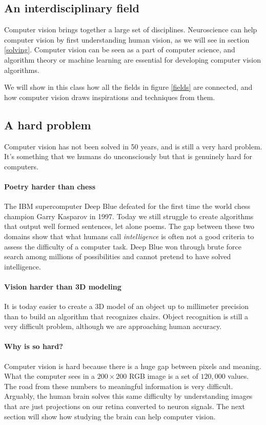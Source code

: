 \documentclass{article}
\begin{document}
\subsection{An interdisciplinary field}

Computer vision brings together a large set of disciplines. Neuroscience can help computer vision by first understanding human vision, as we will see in section \ref{solving}. Computer vision can be seen as a part of computer science, and algorithm theory or machine learning are essential for developing computer vision algorithms.

We will show in this class how all the fields in figure \ref{fields} are connected, and how computer vision draws inspirations and techniques from them.

\subsection{A hard problem}

Computer vision has not been solved in 50 years, and is still a very hard problem. It's something that we humans do unconsciously but that is genuinely hard for computers.

\paragraph{Poetry harder than chess}
The IBM supercomputer Deep Blue defeated for the first time the world chess champion Garry Kasparov in 1997. Today we still struggle to create algorithms that output well formed sentences, let alone poems.
The gap between these two domains show that what humans call \textit{intelligence} is often not a good criteria to assess the difficulty of a computer task. Deep Blue won through brute force search among millions of possibilities and cannot pretend to have solved intelligence.

\paragraph{Vision harder than 3D modeling}
It is today easier to create a 3D model of an object up to millimeter precision than to build an algorithm that recognizes chairs. Object recognition is still a very difficult problem, although we are approaching human accuracy.

\paragraph{Why is so hard?}
Computer vision is hard because there is a huge gap between pixels and meaning. What the computer sees in a $200 \times 200$ RGB image is a set of $120,000$ values. The road from these numbers to meaningful information is very difficult. Arguably, the human brain solves this same difficulty by understanding images that are just projections on our retina converted to neuron signals. The next section will show how studying the brain can help computer vision.
\end{document}
